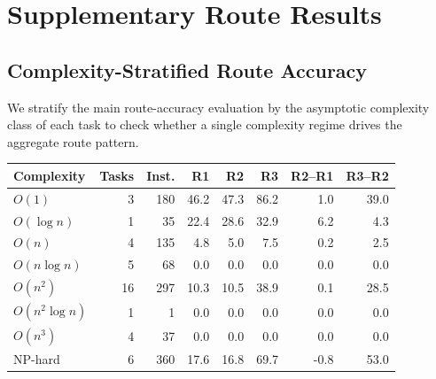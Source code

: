 
\clearpage
\onecolumn

\captionsetup[table]{font=small,labelfont=bf,textfont=normalfont,labelsep=colon,skip=5pt,hypcap=false}

\newcommand{\RouteOne}{Route~1}
\newcommand{\RouteTwo}{Route~2}
\newcommand{\RouteThree}{Route~3}
\newcommand{\appendixresult}[1]{\par\noindent\textbf{Result.}~#1\par}
\newenvironment{appendixtableblock}{\par\smallskip\noindent\begin{minipage}{\linewidth}\centering}{\end{minipage}\par\smallskip}

\section{Supplementary Route Results}
\label{app:route_robustness}

\subsection{Complexity-Stratified Route Accuracy}
\label{app:complexity_stratified_route_accuracy}

We stratify the main route-accuracy evaluation by the asymptotic complexity
class of each task to check whether a single complexity regime drives the
aggregate route pattern.

\begin{appendixtableblock}
\footnotesize
\setlength{\tabcolsep}{4pt}
\begin{tabular*}{\linewidth}{@{\extracolsep{\fill}}lrrrrrrr@{}}
\toprule
Complexity & Tasks & Inst. & R1 & R2 & R3 & R2--R1 & R3--R2 \\
\midrule
$O(1)$ & 3 & 180 & 46.2 & 47.3 & 86.2 & 1.0 & 39.0 \\
$O(\log n)$ & 1 & 35 & 22.4 & 28.6 & 32.9 & 6.2 & 4.3 \\
$O(n)$ & 4 & 135 & 4.8 & 5.0 & 7.5 & 0.2 & 2.5 \\
$O(n \log n)$ & 5 & 68 & 0.0 & 0.0 & 0.0 & 0.0 & 0.0 \\
$O(n^2)$ & 16 & 297 & 10.3 & 10.5 & 38.9 & 0.1 & 28.5 \\
$O(n^2 \log n)$ & 1 & 1 & 0.0 & 0.0 & 0.0 & 0.0 & 0.0 \\
$O(n^3)$ & 4 & 37 & 0.0 & 0.0 & 0.0 & 0.0 & 0.0 \\
NP-hard & 6 & 360 & 17.6 & 16.8 & 69.7 & -0.8 & 53.0 \\
\bottomrule
\end{tabular*}
\label{tab:appendix_complexity_routes}
\end{appendixtableblock}


